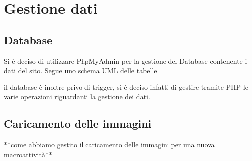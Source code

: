 \section{Gestione dati}
\subsection{Database}
Si è deciso di utilizzare PhpMyAdmin per la gestione del Database contenente i dati del sito. 
Segue uno schema UML delle tabelle 
\begin{figure}[h]
	\centering
\end{figure}
il database è inoltre privo di trigger, si è deciso infatti di gestire tramite PHP le varie operazioni riguardanti la gestione dei dati.
\subsection{Caricamento delle immagini}
**come abbiamo gestito il caricamento delle immagini per una nuova macroattività**